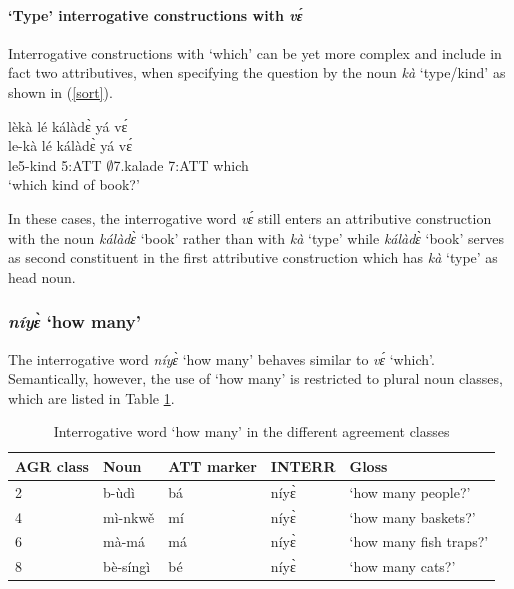 \paragraph{`Type' interrogative constructions with {\itshape vɛ́}} Interrogative constructions with `which' can be yet more complex and include in fact two attributives, when specifying the question by the noun {\itshape kà} `type/kind' as shown in (\ref{sort}).

\begin{exe}
\ex\label{sort}
  \glll     lèkà lé kálàdɛ̀ yá vɛ́ \\
         le-kà lé kálàdɛ̀ yá vɛ́ \\
                le5-kind 5:ATT $\emptyset$7.kalade 7:ATT which \\
    \trans `which kind of book?'
\end {exe}

\noindent In these cases, the interrogative word {\itshape vɛ́} still enters an attributive construction with the noun {\itshape kálàdɛ̀} `book' rather than with {\itshape kà} `type' while {\itshape kálàdɛ̀} `book' serves as second constituent in the first attributive construction which has {\itshape kà} `type' as head noun.

\subsubsection{{\itshape níyɛ̀} `how many'}
\label{sec:howmany}

The interrogative word {\itshape níyɛ̀} `how many' behaves similar to {\itshape vɛ́} `which'. Semantically, however, the use of `how many' is restricted to plural noun classes, which are listed in Table \ref{Tab:howmany}.

\begin{table} 
\centering
\begin{tabular}{lllll}
 \midrule
AGR class & Noun &  ATT marker & INTERR & Gloss \\
  \midrule
 2 & b-ùdì &  bá & níyɛ̀ & `how many people?'  \\
4 & mì-nkwě & mí & níyɛ̀ & `how many baskets?' \\
6 & mà-má & má & níyɛ̀ & `how many fish traps?' \\
8 & bè-síngì &  bé & níyɛ̀ & `how many cats?' \\
  \midrule
\end{tabular}
\caption{Interrogative word `how many' in the different agreement classes}
\label{Tab:howmany}
\end{table}

